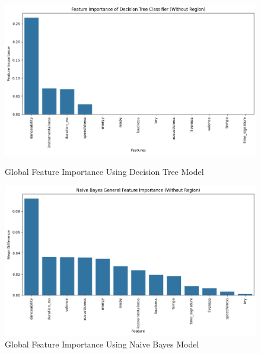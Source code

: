 \begin{figure}[h]
    \centering
    \begin{minipage}{0.45\textwidth}
        \centering
        \includegraphics[width=\linewidth]{media/decision_tree_fea_imp_global.png}
        \caption{Global Feature Importance Using Decision Tree Model}
    \end{minipage}%
    \hspace{0.05\textwidth} %
    \begin{minipage}{0.45\textwidth}
        \centering
        \includegraphics[width=\linewidth]{media/naive_bayes_fea_imp_global.png}
        \caption{Global Feature Importance Using Naive Bayes Model}
    \end{minipage}
\end{figure}


